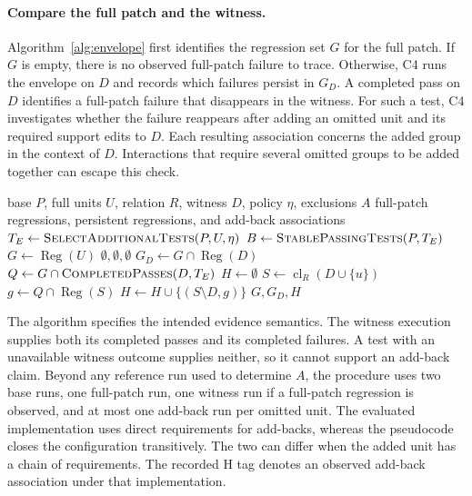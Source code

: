 \documentclass[a4paper,fleqn]{cas-sc}
\newcommand{\lab}[1]{\textsf{#1}}
\newcommand{\cl}{\operatorname{cl}}
\begin{document}
\paragraph{Compare the full patch and the witness.} Algorithm~\ref{alg:envelope} first identifies the regression set $G$ for the full patch. If $G$ is empty, there is no observed full-patch failure to trace. Otherwise, C4 runs the envelope on $D$ and records which failures persist in $G_D$. A completed pass on $D$ identifies a full-patch failure that disappears in the witness. For such a test, C4 investigates whether the failure reappears after adding an omitted unit and its required support edits to $D$. Each resulting association concerns the added group in the context of $D$. Interactions that require several omitted groups to be added together can escape this check.

\begin{algorithm}[tbp]
\caption{Envelope observations and add-back witnesses (C4)}\label{alg:envelope}
\begin{algorithmic}[1]
\Require base $P$, full units $U$, relation $R$, witness $D$, policy $\eta$, exclusions $A$
\Ensure full-patch regressions, persistent regressions, and add-back associations
\State $T_E\gets\Call{SelectAdditionalTests}{P,U,\eta}$
\State $B\gets\Call{StablePassingTests}{P,T_E}$
\State $G\gets\operatorname{Reg}(U)$ 
 \State \Return $\emptyset,\emptyset,\emptyset$ \EndIf
\State $G_D\gets G\cap\operatorname{Reg}(D)$
\State $Q\gets G\cap\Call{CompletedPasses}{D,T_E}$
\State $H\gets\emptyset$
  \State $S\gets\cl_R(D\cup\{u\})$
  \State $g\gets Q\cap\operatorname{Reg}(S)$
   \State $H\gets H\cup\{(S\setminus D,g)\}$ \EndIf
\EndFor
\State \Return $G,G_D,H$
\end{algorithmic}
\end{algorithm}

The algorithm specifies the intended evidence semantics. The witness execution supplies both its completed passes and its completed failures. A test with an unavailable witness outcome supplies neither, so it cannot support an add-back claim. Beyond any reference run used to determine $A$, the procedure uses two base runs, one full-patch run, one witness run if a full-patch regression is observed, and at most one add-back run per omitted unit. The evaluated implementation uses direct requirements for add-backs, whereas the pseudocode closes the configuration transitively. The two can differ when the added unit has a chain of requirements. The recorded \lab{H} tag denotes an observed add-back association under that implementation.
\end{document}
